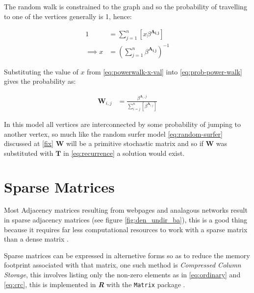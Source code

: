 \documentclass[11pt]{article}
\begin{document}
The random walk is constrained to the graph and so the probability of travelling
to one of the vertices generally is 1, hence:


\begin{align}
      1 &= \sum^{n}_{j= 1}   \left[ x \beta^{\mathbf{A_{i,j}}} \right] \\
       \implies  x&= \left( \sum^{n}_{j= 1}   \beta^{\mathbf{A_{i,j}}}
       \right)^{-1} \label{eq:powerwalk-x-val}
\end{align}

Substituting the value of \(x\) from \eqref{eq:powerwalk-x-val} into \eqref{eq:prob-power-walk} gives the probability as:

\begin{align}
      \mathbf{W}_{i,j} &= \frac{\beta^{\mathbf{A}__i,j}}{\sum^{n}_{i=j}
      \left[ \beta^{\mathbf{A}_{i,j}} \right] } \label{eq:power-walk-recurrence}
\end{align}

In this model all vertices are interconnected by some probability of jumping to
another vertex, so much like the random surfer model \eqref{eq:random-surfer} discussed
at \ref{fix} \(\mathbf{W}\) will be a primitive stochastic matrix and so if
\(\mathbf{W}\) was substituted with \(\mathbf{T}\) in \eqref{eq:recurrence} a solution
would exist.

\section{Sparse Matrices}
\label{sparse-matrix}
Most Adjacency matrices resulting from webpages and analagous networks
result in sparse adjacency matrices (see figure \ref{fig:den_undir_ba}),
this is a good thing because it requires far less computational
resources to work with a sparse matrix than a dense matrix
 \cite[]{langvilleGooglePageRankScience2012} .

Sparse matrices can be expressed in alternetive forms so as to reduce the memory
footprint associated with that matrix, one such method is \emph{Compressed Column
Storage}, this involves listing only the non-zero elements as in \eqref{eq:ordinary}
and \eqref{eq:crc}, this is implemented in \textbf{\emph{R}} with the \texttt{Matrix} package \cite{douglasbatesMatrixSparseDense2019}.
\end{document}
